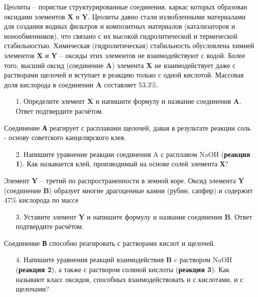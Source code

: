 
Цеолиты – пористые структурированные соединения, каркас которых образован оксидами элементов \textbf{X} и \textbf{Y}. Цеолиты давно стали излюбленными материалами для создания водных фильтров и композитных материалов (катализаторов и ионообменников), что связано с их высокой гидролитической и термической стабильностью. Химическая (гидролитическая) стабильность обусловлена химией элементов \textbf{X} и \textbf{Y} – оксиды этих элементов не взаимодействуют с водой. Более того, высший оксид (соединение \textbf{A}) элемента \textbf{X} не взаимодействует даже с растворами щелочей и вступает в реакцию только с одной кислотой. Массовая доля кислорода в соединении \textbf{A} составляет 53.3\%.
\begin{enumerate}
\item[1.] Определите элемент \textbf{X} и напишите формулу и название соединения \textbf{A}. Ответ подтвердите расчётом.
\end{enumerate}
Соединение \textbf{А} реагирует с расплавами щелочей, давая в результате реакции соль - основу советского канцелярского клея.
\begin{enumerate}
\item[2.] Напишите уравнение реакции соединения A с расплавом NaOH (\textbf{реакция 1}). Как называется клей, производимый на основе солей элемента \textbf{Х}? 
\end{enumerate}
Элемент \textbf{Y} – третий по распространенности в земной коре. Оксид элемента \textbf{Y} (соединение \textbf{B}) образует многие драгоценные камни (рубин, сапфир) и содержит 47\% кислорода по массе
\begin{enumerate}
\item[3.] Уставите элемент \textbf{Y} и напишите формулу и название соединения \textbf{B}. Ответ подтвердите расчётом.
\end{enumerate}
Соединение \textbf{В} способно реагировать с растворами кислот и щелочей.
\begin{enumerate}
\item[4.] Напишите уравнения реакций взаимодействия \textbf{B} c раствором NaOH (\textbf{реакция 2}), а также с раствором соляной кислоты (\textbf{реакция 3}). Как называют класс оксидов, способных взаимодействовать и с кислотами, и с щелочами?
\end{enumerate}

